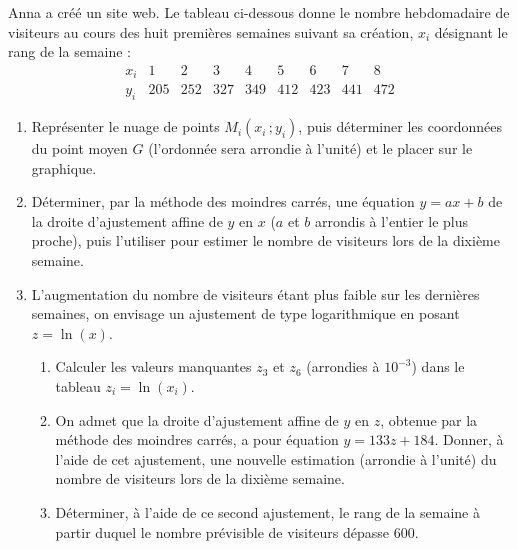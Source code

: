 \begin{annales}
Anna a créé un site web. Le tableau ci-dessous donne le nombre hebdomadaire
de visiteurs au cours des huit premières semaines suivant sa création, $x_{i}$
désignant le rang de la semaine :
\[
  \begin{array}{c|cccccccc}
    x_{i} & 1 & 2 & 3 & 4 & 5 & 6 & 7 & 8 \\
    \hline
    y_{i} & 205 & 252 & 327 & 349 & 412 & 423 & 441 & 472
  \end{array}
\]
\begin{enumerate}[label=\textbf{\arabic*.}, leftmargin=*, itemsep=0.2em]
  \item Représenter le nuage de points $M_{i}(x_{i}\,;y_{i})$, puis
        déterminer les coordonnées du point moyen $G$ (l'ordonnée sera
        arrondie à l'unité) et le placer sur le graphique.
  \item Déterminer, par la méthode des moindres carrés, une équation
        $y = ax+b$ de la droite d'ajustement affine de $y$ en $x$ ($a$ et $b$
        arrondis à l'entier le plus proche), puis l'utiliser pour estimer le
        nombre de visiteurs lors de la dixième semaine.
  \item L'augmentation du nombre de visiteurs étant plus faible sur les
        dernières semaines, on envisage un ajustement de type logarithmique
        en posant $z = \ln(x)$.
        \begin{enumerate}[label=\textbf{\alph*)}, leftmargin=1.2em]
          \item Calculer les valeurs manquantes $z_{3}$ et $z_{6}$
                (arrondies à $10^{-3}$) dans le tableau
                $z_{i} = \ln(x_{i})$.
          \item On admet que la droite d'ajustement affine de $y$ en $z$,
                obtenue par la méthode des moindres carrés, a pour équation
                $y = 133z+184$. Donner, à l'aide de cet ajustement, une
                nouvelle estimation (arrondie à l'unité) du nombre de
                visiteurs lors de la dixième semaine.
          \item Déterminer, à l'aide de ce second ajustement, le rang de la
                semaine à partir duquel le nombre prévisible de visiteurs
                dépasse $600$.
        \end{enumerate}
\end{enumerate}
\end{annales}

